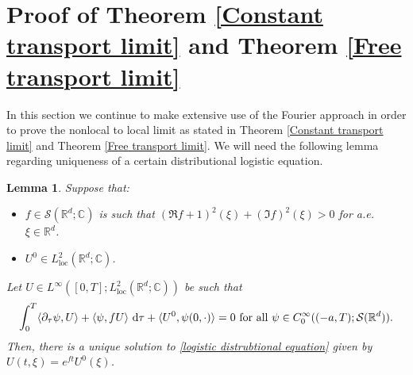 \documentclass[11pt,reqno]{amsart}
\newtheorem{lem}[thm]{Lemma}
\numberwithin{equation}{section}
\def\dd{{\rm d}}
\begin{document}
\section{Proof of Theorem \ref{Constant transport limit} and Theorem \ref{Free transport limit}}\label{Proof of main theorems sec}
In this section we continue to make extensive use of the Fourier approach in order to prove the nonlocal to local limit as stated in Theorem \ref{Constant transport limit} and Theorem \ref{Free transport limit}. We will need the following lemma regarding uniqueness of a certain distributional logistic equation.  
\begin{lem} \label{Uniqueness lemma}
Suppose that: 
\begin{itemize}
    \item $f\in \mathcal{S}(\mathbb{R}^{d};\mathbb{C})$ is such that $(\Re f+1)^{2}(\xi)+(\Im f)^{2}(\xi)> 0$ for a.e. $\xi\in \mathbb{R}^{d}$. 
    \item $U^{0}\in L^{2}_{\mathrm{loc}}(\mathbb{R}^{d};\mathbb{C})$.
\end{itemize}
Let $U\in L^{\infty}
([0,T];L^{2}_{\mathrm{loc}}(\mathbb{R}^{d};\mathbb{C}))$ be such that 
\begin{align}
\int_{0}^{T}\langle \partial_{\tau}\psi,U\rangle+\langle \psi, fU \rangle\ \dd \tau+\langle U^{0},\psi(0,\cdot)\rangle =0\ \mbox{for all}\ \psi\in C^{\infty}_{0}((-a,T);\mathcal{S}(\mathbb{R}^{d})). 
\label{logistic distrubtional equation}
\end{align}
Then, there is a unique solution to \eqref{logistic distrubtional equation} given by   $U(t,\xi)=e^{ft}U^{0}(\xi)$. 
\end{lem}
\end{document}
